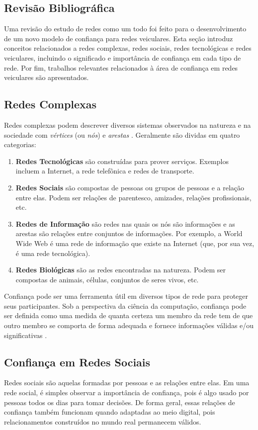 \begin{resumoextendido}
	\section*{Revisão Bibliográfica}
	
	Uma revisão do estudo de redes como um todo foi feito para o desenvolvimento de um novo modelo de confiança para redes veiculares.
	Esta seção introduz conceitos relacionados a redes complexas, redes sociais, redes tecnológicas e redes veiculares, incluindo o significado e importância de confiança em cada tipo de rede.
	Por fim, trabalhos relevantes relacionados à área de confiança em redes veiculares são apresentados.
	
	\subsection*{Redes Complexas}
	Redes complexas podem descrever diversos sistemas observados na natureza e na sociedade com \textit{vértices} (ou \textit{nós}) e \textit{arestas} \citep{newmannetworks}.
	Geralmente são dividas em quatro categorias:
	\begin{enumerate}
		\item \textbf{Redes Tecnológicas} são construídas para prover serviços. Exemplos incluem a Internet, a rede telefônica e redes de transporte.
		\item \textbf{Redes Sociais} são compostas de pessoas ou grupos de pessoas e a relação entre elas. Podem ser relações de parentesco, amizades, relações profissionais, etc.
		\item \textbf{Redes de Informação} são redes nas quais os nós são informações e as arestas são relações entre conjuntos de informações. Por exemplo, a World Wide Web é uma rede de informação que existe na Internet (que, por sua vez, é uma rede tecnológica).
		\item \textbf{Redes Biológicas} são as redes encontradas na natureza. Podem ser compostas de animais, células, conjuntos de seres vivos, etc.
	\end{enumerate}
	
	Confiança pode ser uma ferramenta útil em diversos tipos de rede para proteger seus participantes.
	Sob a perspectiva da ciência da computação, confiança pode ser definida como uma medida de quanta certeza um membro da rede tem de que outro membro se comporta de forma adequada e fornece informações válidas e/ou significativas \citep{sherchan2013survey}.
	
	\subsection*{Confiança em Redes Sociais}
	Redes sociais são aquelas formadas por pessoas e as relações entre elas. 
	Em uma rede social, é simples observar a importância de confiança, pois é algo usado por pessoas todos os dias para tomar decisões.
	De forma geral, essas relações de confiança também funcionam quando adaptadas ao meio digital, pois relacionamentos construídos no mundo real permanecem válidos.
	

\end{resumoextendido}
